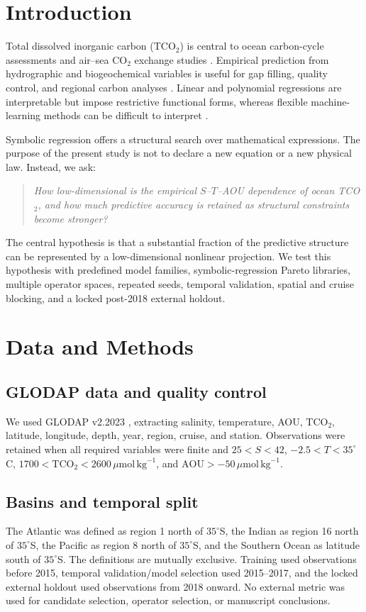 \documentclass[12pt,a4paper]{article}
\newcommand{\tco}{\mathrm{TCO_2}}
\newcommand{\aou}{\mathrm{AOU}}
\newcommand{\umol}{\,\mu\mathrm{mol}\,\mathrm{kg}^{-1}}
\begin{document}
\section{Introduction}
Total dissolved inorganic carbon (TCO$_2$) is central to ocean carbon-cycle assessments and air--sea CO$_2$ exchange studies \citep{Sarmiento2006}. Empirical prediction from hydrographic and biogeochemical variables is useful for gap filling, quality control, and regional carbon analyses \citep{Takahashi1993,Key2004}. Linear and polynomial regressions are interpretable but impose restrictive functional forms, whereas flexible machine-learning methods can be difficult to interpret \citep{Goyet1991,Millero1998,Broullon2019}.

Symbolic regression offers a structural search over mathematical expressions. The purpose of the present study is not to declare a new equation or a new physical law. Instead, we ask:
\begin{quote}
\emph{How low-dimensional is the empirical $S$--$T$--AOU dependence of ocean TCO$_2$, and how much predictive accuracy is retained as structural constraints become stronger?}
\end{quote}

The central hypothesis is that a substantial fraction of the predictive structure can be represented by a low-dimensional nonlinear projection. We test this hypothesis with predefined model families, symbolic-regression Pareto libraries, multiple operator spaces, repeated seeds, temporal validation, spatial and cruise blocking, and a locked post-2018 external holdout.

\section{Data and Methods}
\subsection{GLODAP data and quality control}
We used GLODAP v2.2023 \citep{Lauvset2023}, extracting salinity, temperature, AOU, TCO$_2$, latitude, longitude, depth, year, region, cruise, and station. Observations were retained when all required variables were finite and $25<S<42$, $-2.5<T<35^\circ$C, $1700<\tco<2600\umol$, and $\aou>-50\umol$.

\subsection{Basins and temporal split}
The Atlantic was defined as region 1 north of $35^\circ$S, the Indian as region 16 north of $35^\circ$S, the Pacific as region 8 north of $35^\circ$S, and the Southern Ocean as latitude south of $35^\circ$S. The definitions are mutually exclusive. Training used observations before 2015, temporal validation/model selection used 2015--2017, and the locked external holdout used observations from 2018 onward. No external metric was used for candidate selection, operator selection, or manuscript conclusions.
\end{document}
